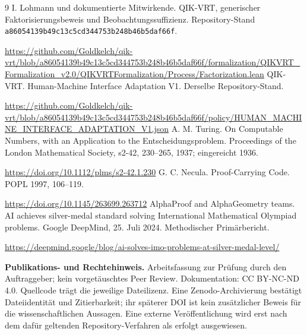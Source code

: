 \documentclass[11pt,a4paper]{article}
\newcommand{\src}{\texttt{a86054139b49c13c5cd344753b248b46b5daf66f}}
\begin{document}
\begin{thebibliography}{9}\small
{} I. Lohmann und dokumentierte Mitwirkende.
QIK-VRT, generischer Faktorisierungsbeweis und Beobachtungssuffizienz.
Repository-Stand \src.\par
\url{https://github.com/Goldkelch/qik-vrt/blob/a86054139b49c13c5cd344753b248b46b5daf66f/formalization/QIKVRT_Formalization_v2.0/QIKVRTFormalization/Process/Factorization.lean}
 QIK-VRT. Human-Machine Interface Adaptation V1.
Derselbe Repository-Stand.\par
\url{https://github.com/Goldkelch/qik-vrt/blob/a86054139b49c13c5cd344753b248b46b5daf66f/policy/HUMAN_MACHINE_INTERFACE_ADAPTATION_V1.json}
 A. M. Turing. On Computable Numbers, with an Application to the
Entscheidungsproblem. Proceedings of the London Mathematical Society,
s2-42, 230--265, 1937; eingereicht 1936.\par
\url{https://doi.org/10.1112/plms/s2-42.1.230}
 G. C. Necula. Proof-Carrying Code. POPL 1997, 106--119.\par
\url{https://doi.org/10.1145/263699.263712}
 AlphaProof and AlphaGeometry teams. AI achieves silver-medal
standard solving International Mathematical Olympiad problems.
Google DeepMind, 25. Juli 2024. Methodischer Primärbericht.\par
\url{https://deepmind.google/blog/ai-solves-imo-problems-at-silver-medal-level/}
\end{thebibliography}
\textbf{Publikations- und Rechtehinweis.} Arbeitsfassung zur Prüfung durch den
Auftraggeber; kein vorgetäuschtes Peer Review. Dokumentation: CC BY-NC-ND 4.0.
Quellcode trägt die jeweilige Dateilizenz. Eine Zenodo-Archivierung bestätigt
Dateiidentität und Zitierbarkeit; ihr späterer DOI ist kein zusätzlicher Beweis
für die wissenschaftlichen Aussagen. Eine externe Veröffentlichung wird erst
nach dem dafür geltenden Repository-Verfahren als erfolgt ausgewiesen.
\end{document}
